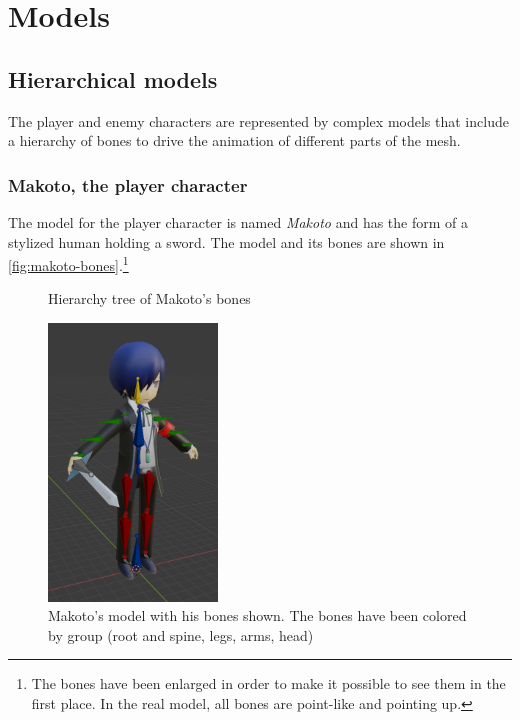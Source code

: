 
{
\let\clearpage\relax

\chapter{Models}
}

\section{Hierarchical models}

The player and enemy characters are represented by complex models that include a hierarchy of bones to drive the animation of different parts of the mesh.

\subsection{Makoto, the player character}

The model for the player character is named \textit{Makoto} and has the form of a stylized human holding a sword. The model and its bones are shown in \autoref*{fig:makoto-bones}.\footnote{The bones have been enlarged in order to make it possible to see them in the first place. In the real model, all bones are point-like and pointing up.}

\begin{figure}[H]
    \centering
    
    \caption{Hierarchy tree of Makoto's bones}
    \label{fig:makoto-graph}
\end{figure}

\begin{figure}
    \centering
    \includegraphics[width=0.4\textwidth]{images/ch3/Makoto-Bones-v2.png}
    \caption{Makoto's model with his bones shown. The bones have been colored by group (root and spine, legs, arms, head)}
    \label{fig:makoto-bones}
\end{figure}

